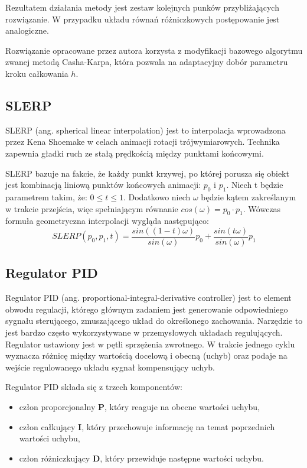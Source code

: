 \documentclass[12pt, oneside]{report}
\theoremstyle{definition}
\begin{document}
Rezultatem działania metody jest zestaw kolejnych punków przybliżających rozwiązanie. W przypadku układu równań różniczkowych postępowanie jest analogiczne. 

Rozwiązanie opracowane przez autora korzysta z modyfikacji bazowego algorytmu zwanej metodą Casha-Karpa, która pozwala na adaptacyjny dobór parametru kroku całkowania \(h\).

\subsection{SLERP}
\label{SLERP}
SLERP (ang. spherical linear interpolation) jest to interpolacja wprowadzona przez Kena Shoemake w celach animacji rotacji trójwymiarowych. Technika zapewnia gładki ruch ze stałą prędkością między punktami końcowymi.

SLERP bazuje na fakcie, że każdy punkt krzywej, po której porusza się obiekt jest kombinacją liniową punktów końcowych animacji: $p_0$ i $p_1$. Niech t będzie parametrem takim, że: $0 \leqslant t \leqslant 1$. Dodatkowo niech $\omega$ będzie kątem zakreślanym w trakcie przejścia, więc spełniającym równanie $cos(\omega) = p_0 \cdot p_1$.
Wówczas formuła geometryczna interpolacji wygląda następująco:
\begin{equation*}
SLERP(p_0, p_1, t) = \frac{sin((1-t)\omega)}{sin(\omega)} p_0 + \frac{sin(t\omega)}{sin(\omega)} p_1
\end{equation*}

\subsection{Regulator PID}
\label{PIDSection}
Regulator PID (ang. proportional-integral-derivative controller) jest to element obwodu regulacji, którego głównym zadaniem jest generowanie odpowiedniego sygnału sterującego, zmuszającego układ do określonego zachowania. Narzędzie to jest bardzo często wykorzystywane w przemysłowych układach regulujących. Regulator ustawiony jest w pętli sprzężenia zwrotnego. W trakcie jednego cyklu wyznacza różnicę między wartością docelową i obecną (uchyb) oraz podaje na wejście regulowanego układu sygnał kompensujący uchyb.


 Regulator PID składa się z trzech komponentów:
\begin{itemize}
\item człon proporcjonalny \textbf{P}, który reaguje na obecne wartości uchybu,
\item człon całkujący \textbf{I}, który przechowuje informację na temat poprzednich wartości uchybu,
\item człon różniczkujący \textbf{D}, który przewiduje następne wartości uchybu.
\end{itemize}
\end{document}
